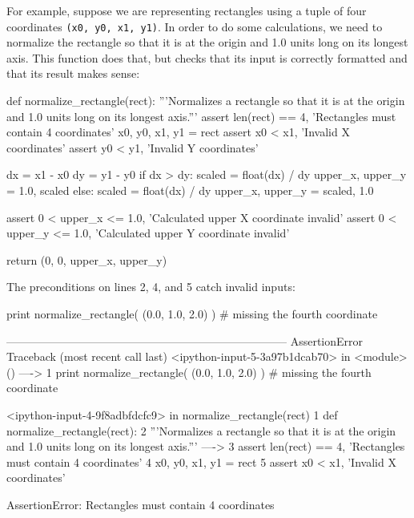 For example, suppose we are representing rectangles using a tuple of
four coordinates \texttt{(x0, y0, x1, y1)}. In order to do some
calculations, we need to normalize the rectangle so that it is at the
origin and 1.0 units long on its longest axis. This function does that,
but checks that its input is correctly formatted and that its result
makes sense:

\begin{VerbIn}
def normalize_rectangle(rect):
    '''Normalizes a rectangle so that it is at the origin and 1.0 units long on its longest axis.'''
    assert len(rect) == 4, 'Rectangles must contain 4 coordinates'
    x0, y0, x1, y1 = rect
    assert x0 < x1, 'Invalid X coordinates'
    assert y0 < y1, 'Invalid Y coordinates'

    dx = x1 - x0
    dy = y1 - y0
    if dx > dy:
        scaled = float(dx) / dy
        upper_x, upper_y = 1.0, scaled
    else:
        scaled = float(dx) / dy
        upper_x, upper_y = scaled, 1.0

    assert 0 < upper_x <= 1.0, 'Calculated upper X coordinate invalid'
    assert 0 < upper_y <= 1.0, 'Calculated upper Y coordinate invalid'

    return (0, 0, upper_x, upper_y)
\end{VerbIn}

The preconditions on lines 2, 4, and 5 catch invalid inputs:

\begin{VerbIn}
print normalize_rectangle( (0.0, 1.0, 2.0) ) # missing the fourth coordinate
\end{VerbIn}

\begin{VerbErr}
---------------------------------------------------------------------------
AssertionError                            Traceback (most recent call last)
<ipython-input-5-3a97b1dcab70> in <module>()
----> 1 print normalize_rectangle( (0.0, 1.0, 2.0) ) # missing the fourth coordinate

<ipython-input-4-9f8adbfdcfc9> in normalize_rectangle(rect)
      1 def normalize_rectangle(rect):
      2     '''Normalizes a rectangle so that it is at the origin and 1.0 units long on its longest axis.'''
----> 3     assert len(rect) == 4, 'Rectangles must contain 4 coordinates'
      4     x0, y0, x1, y1 = rect
      5     assert x0 < x1, 'Invalid X coordinates'

AssertionError: Rectangles must contain 4 coordinates
\end{VerbErr}

